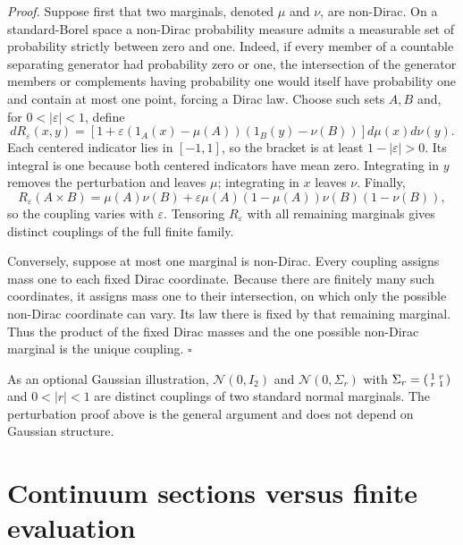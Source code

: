 \noindent\emph{Proof.} Suppose first that two marginals, denoted $\mu$ and $\nu$, are non-Dirac. On a standard-Borel space a non-Dirac probability measure admits a measurable set of probability strictly between zero and one. Indeed, if every member of a countable separating generator had probability zero or one, the intersection of the generator members or complements having probability one would itself have probability one and contain at most one point, forcing a Dirac law. Choose such sets $A,B$ and, for $0<|\varepsilon|<1$, define
\begin{equation}
dR_\varepsilon(x,y)
=
\left[1+\varepsilon(1_A(x)-\mu(A))(1_B(y)-\nu(B))\right]
d\mu(x)d\nu(y).
\label{eq:prob-coupling-perturbation}
\end{equation}
Each centered indicator lies in $[-1,1]$, so the bracket is at least $1-|\varepsilon|>0$. Its integral is one because both centered indicators have mean zero. Integrating in $y$ removes the perturbation and leaves $\mu$; integrating in $x$ leaves $\nu$. Finally,
\[
R_\varepsilon(A\times B)
=\mu(A)\nu(B)
+\varepsilon\mu(A)(1-\mu(A))\nu(B)(1-\nu(B)),
\]
so the coupling varies with $\varepsilon$. Tensoring $R_\varepsilon$ with all remaining marginals gives distinct couplings of the full finite family.

Conversely, suppose at most one marginal is non-Dirac. Every coupling assigns mass one to each fixed Dirac coordinate. Because there are finitely many such coordinates, it assigns mass one to their intersection, on which only the possible non-Dirac coordinate can vary. Its law there is fixed by that remaining marginal. Thus the product of the fixed Dirac masses and the one possible non-Dirac marginal is the unique coupling. \hfill$\square$

As an optional Gaussian illustration, $\mathcal N(0,I_2)$ and $\mathcal N(0,\Sigma_r)$ with $\Sigma_r=\begin{psmallmatrix}1&r\\r&1\end{psmallmatrix}$ and $0<|r|<1$ are distinct couplings of two standard normal marginals. The perturbation proof above is the general argument and does not depend on Gaussian structure.

\section{Continuum sections versus finite evaluation}
\label{sec:prob-compatibility}

